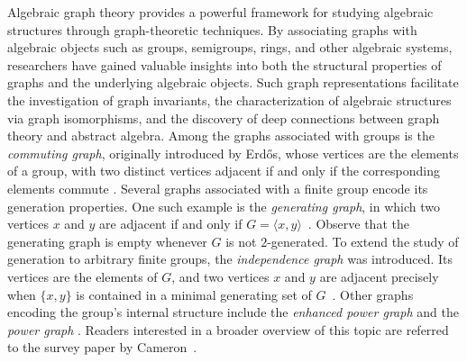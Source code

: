 \documentclass[preprint,11pt]{elsarticle}
\begin{document}
   
   
   
   

Algebraic graph theory provides a powerful framework for studying algebraic 
structures through graph-theoretic techniques. By associating graphs with 
algebraic objects such as groups, semigroups, rings, and other algebraic 
systems, researchers have gained valuable insights into both the structural 
properties of graphs and the underlying algebraic objects. Such graph 
representations facilitate the investigation of graph invariants, the 
characterization of algebraic structures via graph isomorphisms, and the 
discovery of deep connections between graph theory and abstract algebra. 
Among the graphs associated with groups is the \emph{commuting graph}, 
originally introduced by Erd\H{o}s, whose vertices are the elements of a 
group, with two distinct vertices adjacent if and only if the corresponding 
elements commute \cite{braurflower,MorganParker2013}. Several graphs 
associated with a finite group encode its generation properties. One such 
example is the \emph{generating graph}, in which two vertices $x$ and $y$ 
are adjacent if and only if $G=\langle x,y\rangle$~\cite{LucchiniMaroti2009}. 
Observe that the generating graph is empty whenever $G$ is not $2$-generated. 
To extend the study of generation to arbitrary finite groups, the 
\emph{independence graph} was introduced. Its vertices are the elements of 
$G$, and two vertices $x$ and $y$ are adjacent precisely when $\{x,y\}$ is 
contained in a minimal generating set of $G$~\cite{Lucchini2020}. Other 
graphs encoding the group's internal structure include the \emph{enhanced 
	power graph} \cite{firstenhcedpwrstrctreaacns1, enhancedpwrgrapbb3} and the 
\emph{power graph} \cite{Bera-Line-graph-comm-alg, jgt-cameron, 
	pwrgraphoffntgrpgc1}. Readers interested in a broader overview of this topic 
are referred to the survey paper by Cameron~\cite{PJC-Graphs-def-grp}.
\end{document}
